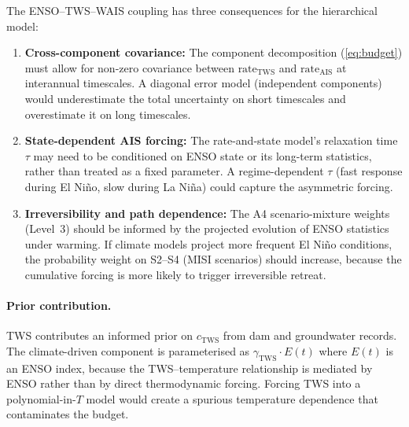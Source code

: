 \documentclass[11pt]{article}
\newcommand{\CDW}{\text{CDW}}
\begin{document}
The ENSO--TWS--WAIS coupling has three consequences for the hierarchical model:

\begin{enumerate}
  \item \textbf{Cross-component covariance:} The component decomposition (\cref{eq:budget}) must allow for non-zero covariance between $\text{rate}_{\text{TWS}}$ and $\text{rate}_{\text{AIS}}$ at interannual timescales.  A diagonal error model (independent components) would underestimate the total uncertainty on short timescales and overestimate it on long timescales.

  \item \textbf{State-dependent AIS forcing:} The rate-and-state model's relaxation time $\tau$ may need to be conditioned on ENSO state or its long-term statistics, rather than treated as a fixed parameter.  A regime-dependent $\tau$ (fast response during El Ni\~no, slow during La Ni\~na) could capture the asymmetric forcing.

  \item \textbf{Irreversibility and path dependence:} The A4 scenario-mixture weights (Level~3) should be informed by the projected evolution of ENSO statistics under warming.  If climate models project more frequent El Ni\~no conditions, the probability weight on S2--S4 (MISI scenarios) should increase, because the cumulative \CDW{} forcing is more likely to trigger irreversible retreat.
\end{enumerate}

\paragraph{Prior contribution.}  TWS contributes an informed prior on $c_{\text{TWS}}$ from dam and groundwater records.  The climate-driven component is parameterised as $\gamma_{\text{TWS}} \cdot E(t)$ where $E(t)$ is an ENSO index, because the TWS--temperature relationship is mediated by ENSO rather than by direct thermodynamic forcing.  Forcing TWS into a polynomial-in-$T$ model would create a spurious temperature dependence that contaminates the budget.
\end{document}
